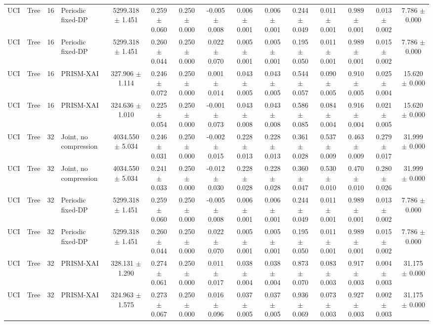 \begin{tabular}{llllccccccccccc}
UCI & Tree & 16 & Periodic fixed-DP & 5299.318 $\pm$ 1.451 & 0.259 $\pm$ 0.060 & 0.250 $\pm$ 0.000 & -0.005 $\pm$ 0.008 & 0.006 $\pm$ 0.001 & 0.006 $\pm$ 0.001 & 0.244 $\pm$ 0.049 & 0.011 $\pm$ 0.001 & 0.989 $\pm$ 0.001 & 0.013 $\pm$ 0.002 & 7.786 $\pm$ 0.000 \\
UCI & Tree & 16 & Periodic fixed-DP & 5299.318 $\pm$ 1.451 & 0.260 $\pm$ 0.044 & 0.250 $\pm$ 0.000 & 0.022 $\pm$ 0.070 & 0.005 $\pm$ 0.001 & 0.005 $\pm$ 0.001 & 0.195 $\pm$ 0.050 & 0.011 $\pm$ 0.001 & 0.989 $\pm$ 0.001 & 0.015 $\pm$ 0.002 & 7.786 $\pm$ 0.000 \\
UCI & Tree & 16 & PRISM-XAI & 327.906 $\pm$ 1.114 & 0.246 $\pm$ 0.072 & 0.250 $\pm$ 0.000 & 0.001 $\pm$ 0.014 & 0.043 $\pm$ 0.005 & 0.043 $\pm$ 0.005 & 0.544 $\pm$ 0.057 & 0.090 $\pm$ 0.005 & 0.910 $\pm$ 0.005 & 0.025 $\pm$ 0.004 & 15.620 $\pm$ 0.000 \\
UCI & Tree & 16 & PRISM-XAI & 324.636 $\pm$ 1.010 & 0.225 $\pm$ 0.054 & 0.250 $\pm$ 0.000 & -0.001 $\pm$ 0.073 & 0.043 $\pm$ 0.008 & 0.043 $\pm$ 0.008 & 0.586 $\pm$ 0.085 & 0.084 $\pm$ 0.004 & 0.916 $\pm$ 0.004 & 0.021 $\pm$ 0.005 & 15.620 $\pm$ 0.000 \\
UCI & Tree & 32 & Joint, no compression & 4034.550 $\pm$ 5.034 & 0.246 $\pm$ 0.031 & 0.250 $\pm$ 0.000 & -0.002 $\pm$ 0.015 & 0.228 $\pm$ 0.013 & 0.228 $\pm$ 0.013 & 0.361 $\pm$ 0.028 & 0.537 $\pm$ 0.009 & 0.463 $\pm$ 0.009 & 0.279 $\pm$ 0.017 & 31.999 $\pm$ 0.000 \\
UCI & Tree & 32 & Joint, no compression & 4034.550 $\pm$ 5.034 & 0.241 $\pm$ 0.033 & 0.250 $\pm$ 0.000 & -0.012 $\pm$ 0.030 & 0.228 $\pm$ 0.028 & 0.228 $\pm$ 0.028 & 0.360 $\pm$ 0.047 & 0.530 $\pm$ 0.010 & 0.470 $\pm$ 0.010 & 0.280 $\pm$ 0.026 & 31.999 $\pm$ 0.000 \\
UCI & Tree & 32 & Periodic fixed-DP & 5299.318 $\pm$ 1.451 & 0.259 $\pm$ 0.060 & 0.250 $\pm$ 0.000 & -0.005 $\pm$ 0.008 & 0.006 $\pm$ 0.001 & 0.006 $\pm$ 0.001 & 0.244 $\pm$ 0.049 & 0.011 $\pm$ 0.001 & 0.989 $\pm$ 0.001 & 0.013 $\pm$ 0.002 & 7.786 $\pm$ 0.000 \\
UCI & Tree & 32 & Periodic fixed-DP & 5299.318 $\pm$ 1.451 & 0.260 $\pm$ 0.044 & 0.250 $\pm$ 0.000 & 0.022 $\pm$ 0.070 & 0.005 $\pm$ 0.001 & 0.005 $\pm$ 0.001 & 0.195 $\pm$ 0.050 & 0.011 $\pm$ 0.001 & 0.989 $\pm$ 0.001 & 0.015 $\pm$ 0.002 & 7.786 $\pm$ 0.000 \\
UCI & Tree & 32 & PRISM-XAI & 328.131 $\pm$ 1.290 & 0.274 $\pm$ 0.061 & 0.250 $\pm$ 0.000 & 0.011 $\pm$ 0.017 & 0.038 $\pm$ 0.004 & 0.038 $\pm$ 0.004 & 0.873 $\pm$ 0.070 & 0.083 $\pm$ 0.003 & 0.917 $\pm$ 0.003 & 0.004 $\pm$ 0.003 & 31.175 $\pm$ 0.000 \\
UCI & Tree & 32 & PRISM-XAI & 324.963 $\pm$ 1.575 & 0.273 $\pm$ 0.067 & 0.250 $\pm$ 0.000 & 0.016 $\pm$ 0.096 & 0.037 $\pm$ 0.005 & 0.037 $\pm$ 0.005 & 0.936 $\pm$ 0.069 & 0.073 $\pm$ 0.003 & 0.927 $\pm$ 0.003 & 0.002 $\pm$ 0.003 & 31.175 $\pm$ 0.000 \\
\bottomrule
\end{tabular}
